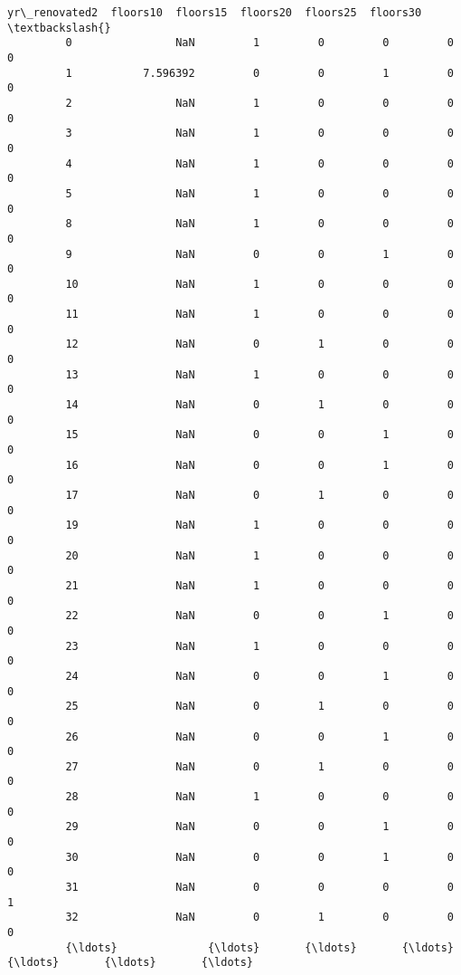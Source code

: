 \documentclass[11pt]{article}
\begin{document}
\begin{Verbatim}[commandchars=\\\{\}]
                yr\_renovated2  floors10  floors15  floors20  floors25  floors30  \textbackslash{}
         0                NaN         1         0         0         0         0   
         1           7.596392         0         0         1         0         0   
         2                NaN         1         0         0         0         0   
         3                NaN         1         0         0         0         0   
         4                NaN         1         0         0         0         0   
         5                NaN         1         0         0         0         0   
         8                NaN         1         0         0         0         0   
         9                NaN         0         0         1         0         0   
         10               NaN         1         0         0         0         0   
         11               NaN         1         0         0         0         0   
         12               NaN         0         1         0         0         0   
         13               NaN         1         0         0         0         0   
         14               NaN         0         1         0         0         0   
         15               NaN         0         0         1         0         0   
         16               NaN         0         0         1         0         0   
         17               NaN         0         1         0         0         0   
         19               NaN         1         0         0         0         0   
         20               NaN         1         0         0         0         0   
         21               NaN         1         0         0         0         0   
         22               NaN         0         0         1         0         0   
         23               NaN         1         0         0         0         0   
         24               NaN         0         0         1         0         0   
         25               NaN         0         1         0         0         0   
         26               NaN         0         0         1         0         0   
         27               NaN         0         1         0         0         0   
         28               NaN         1         0         0         0         0   
         29               NaN         0         0         1         0         0   
         30               NaN         0         0         1         0         0   
         31               NaN         0         0         0         0         1   
         32               NaN         0         1         0         0         0   
         {\ldots}              {\ldots}       {\ldots}       {\ldots}       {\ldots}       {\ldots}       {\ldots}   

\end{Verbatim}
\end{document}
